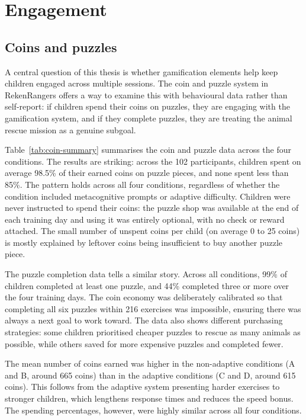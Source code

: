 \section{Engagement}
\subsection{Coins and puzzles}
A central question of this thesis is whether gamification elements help keep children engaged across multiple sessions. The coin and puzzle system in RekenRangers offers a way to examine this with behavioural data rather than self-report: if children spend their coins on puzzles, they are engaging with the gamification system, and if they complete puzzles, they are treating the animal rescue mission as a genuine subgoal.

Table~\ref{tab:coin-summary} summarises the coin and puzzle data across the four conditions. The results are striking: across the 102 participants, children spent on average 98.5\% of their earned coins on puzzle pieces, and none spent less than 85\%. The pattern holds across all four conditions, regardless of whether the condition included metacognitive prompts or adaptive difficulty. Children were never instructed to spend their coins: the puzzle shop was available at the end of each training day and using it was entirely optional, with no check or reward attached. The small number of unspent coins per child (on average 0 to 25 coins) is mostly explained by leftover coins being insufficient to buy another puzzle piece.

The puzzle completion data tells a similar story. Across all conditions, 99\% of children completed at least one puzzle, and 44\% completed three or more over the four training days. The coin economy was deliberately calibrated so that completing all six puzzles within 216 exercises was impossible, ensuring there was always a next goal to work toward. The data also shows different purchasing strategies: some children prioritised cheaper puzzles to rescue as many animals as possible, while others saved for more expensive puzzles and completed fewer.

The mean number of coins earned was higher in the non-adaptive conditions (A and B, around 665 coins) than in the adaptive conditions (C and D, around 615 coins). This follows from the adaptive system presenting harder exercises to stronger children, which lengthens response times and reduces the speed bonus. The spending percentages, however, were highly similar across all four conditions.

